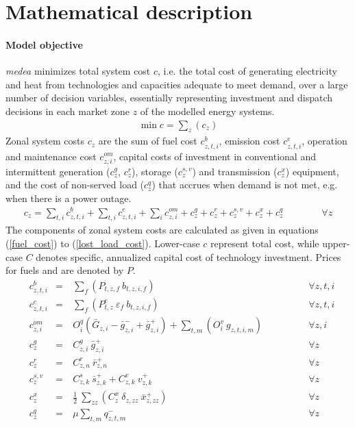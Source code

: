 \documentclass[11pt,a4paper]{article}
\begin{document}
\newpage
\section{Mathematical description} \label{mathmodel}

\paragraph{Model objective}
\emph{medea} minimizes total system cost $c$, i.e. the total cost of generating electricity and heat from technologies and capacities adequate to meet demand, over a large number  of decision variables, essentially representing investment and dispatch decisions in each market zone $z$ of the modelled energy systems.
\begin{align}
\min c = \sum_{z} (c_{z})
\end{align}
Zonal system costs $c_{z}$ are the sum of fuel cost $c^{b}_{z,t,i}$, emission cost $c^{e}_{z,t,i}$, operation and maintenance cost $c^{om}_{z,i}$, capital costs of investment in conventional and intermittent generation ($c^{g}_{z}$, $c^{r}_{z}$), storage ($c^{s,v}_{z}$) and transmission ($c^{x}_{z}$) equipment, and the cost of non-served load ($c^{q}_{z}$) that accrues when demand is not met, e.g. when there is a power outage. 
\begin{align}
c_{z} = \sum_{t,i}  c^{b}_{z,t,i} + \sum_{t,i} c^{e}_{z,t,i} + \sum_{i} c^{om}_{z,i} + c^{g}_{z} + 
 c^{r}_{z} + c^{s,v}_{z} + c^{x}_{z} + c^{q}_{z} \qquad \qquad \forall z
\end{align}
The components of zonal system costs are calculated as given in equations (\ref{fuel_cost}) to (\ref{lost_load_cost}).
Lower-case $c$ represent total cost, while upper-case $C$ denotes specific, annualized capital cost of technology investment. Prices for fuels and  are denoted by $P$.
\begin{align}
&c^{b}_{z,t,i}& =&\ \sum_{f} \left( P_{t,z,f} \: b_{t,z,i,f} \right) \qquad \qquad &\forall z,t,i \label{fuel_cost} \\
&c^{e}_{z,t,i}& =&\ \sum_{f} \left( P^{e}_{t,z} \: \varepsilon_{f} \: b_{t,z,i,f} \right) \qquad \qquad &\forall z,t,i\\
&c^{om}_{z,i}& =&\ O^{q}_{i} \left(\bar{G}_{z,i} - \bar{g}^{-}_{z,i} + \bar{g}^{+}_{z,i}\right) + \sum_{t,m} \left(O^{v}_{i} \: g_{z,t,i,m}\right) \qquad \qquad &\forall z,i \\
&c^{g}_{z}& =&\ C^{g}_{z,i} \: \bar{g}^{+}_{z,i} \qquad \qquad &\forall z\\
&c^{r}_{z}& =&\ C^{r}_{z,n} \: \bar{r}^{+}_{z,n} \qquad \qquad &\forall z\\
&c^{s,v}_{z}& =&\ C^{s}_{z,k} \: \bar{s}^{+}_{z,k} + C^{v}_{z,k} \: v^{+}_{z,k} \qquad \qquad &\forall z\\
&c^{x}_{z}& =&\ \frac{1}{2} \: \sum_{zz} (C^{x}_{z} \: \delta_{z,zz} \: \bar{x}^{+}_{z,zz}) \qquad \qquad &\forall z \label{transmission_expansion_cost}\\
&c^{q}_{z}& =&\ \mu \sum_{t,m} q^{-}_{z,t,m} \qquad \qquad &\forall z \label{lost_load_cost}
\end{align}
\end{document}
